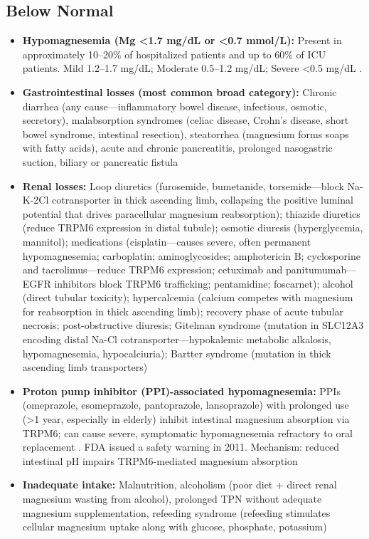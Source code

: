 \subsection*{Below Normal}
\begin{itemize}
  \item \textbf{Hypomagnesemia (Mg <1.7 mg/dL or <0.7 mmol/L):} Present in approximately 10--20\% of hospitalized patients and up to 60\% of ICU patients. Mild 1.2--1.7 mg/dL; Moderate 0.5--1.2 mg/dL; Severe <0.5 mg/dL \cite{agus1999hypomagnesemia}.
  \item \textbf{Gastrointestinal losses (most common broad category):} Chronic diarrhea (any cause---inflammatory bowel disease, infectious, osmotic, secretory), malabsorption syndromes (celiac disease, Crohn's disease, short bowel syndrome, intestinal resection), steatorrhea (magnesium forms soaps with fatty acids), acute and chronic pancreatitis, prolonged nasogastric suction, biliary or pancreatic fistula
  \item \textbf{Renal losses:} Loop diuretics (furosemide, bumetanide, torsemide---block Na-K-2Cl cotransporter in thick ascending limb, collapsing the positive luminal potential that drives paracellular magnesium reabsorption); thiazide diuretics (reduce TRPM6 expression in distal tubule); osmotic diuresis (hyperglycemia, mannitol); medications (cisplatin---causes severe, often permanent hypomagnesemia; carboplatin; aminoglycosides; amphotericin B; cyclosporine and tacrolimus---reduce TRPM6 expression; cetuximab and panitumumab---EGFR inhibitors block TRPM6 trafficking; pentamidine; foscarnet); alcohol (direct tubular toxicity); hypercalcemia (calcium competes with magnesium for reabsorption in thick ascending limb); recovery phase of acute tubular necrosis; post-obstructive diuresis; Gitelman syndrome (mutation in SLC12A3 encoding distal Na-Cl cotransporter---hypokalemic metabolic alkalosis, hypomagnesemia, hypocalciuria); Bartter syndrome (mutation in thick ascending limb transporters)
  \item \textbf{Proton pump inhibitor (PPI)-associated hypomagnesemia:} PPIs (omeprazole, esomeprazole, pantoprazole, lansoprazole) with prolonged use (>1 year, especially in elderly) inhibit intestinal magnesium absorption via TRPM6; can cause severe, symptomatic hypomagnesemia refractory to oral replacement \cite{fda2011low}. FDA issued a safety warning in 2011. Mechanism: reduced intestinal pH impairs TRPM6-mediated magnesium absorption
  \item \textbf{Inadequate intake:} Malnutrition, alcoholism (poor diet + direct renal magnesium wasting from alcohol), prolonged TPN without adequate magnesium supplementation, refeeding syndrome (refeeding stimulates cellular magnesium uptake along with glucose, phosphate, potassium)

\end{itemize}
